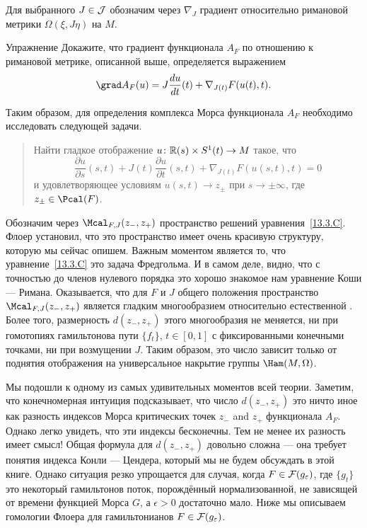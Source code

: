 Для выбранного $J\in\mathcal{J}$ обозначим через $\nabla_{J}$ градиент
относительно римановой метрики $\Omega(\xi,J\eta)$ на $M$.
\begin{ex}{Упражнение}\label{13.3.B}
  Докажите, что градиент функционала $A_{F}$ по отношению к римановой метрике,
  описанной выше, определяется выражением 
  \[
  \grad A_{F}(u)=J\frac{\d u}{\d t}(t)+\nabla_{J(t)}F(u(t),t).
  \]
\end{ex}
Таким образом, для определения комплекса Морса функционала $A_{F}$
необходимо исследовать  следующей задачи.
\begin{quote}
  Найти гладкое отображение $u \colon \mathbb{R}(s)\times S^{1}(t)\to M$ такое,
  что
  \begin{equation}\label{13.3.C}
    \frac{\partial u}{\partial s}(s,t) +
    J(t)\frac{\partial u}{\partial t}(s,t) +
    \nabla_{J(t)}F(u(s,t),t) = 0
  \end{equation}
  и удовлетворяющее условиям $u(s,t)\to z_{\pm}$ при $s\to\pm\infty$,
  где $z_{\pm}\z\in\Pcal(F)$.
\end{quote}
Обозначим через $\Mcal_{F,J}(z_{-},z_{+})$ пространство решений
уравнения~\ref{13.3.C}. 
Флоер установил, что это пространство имеет очень красивую структуру,
которую мы сейчас опишем.
Важным моментом является то, что уравнение~\ref{13.3.C} это задача Фредгольма.
И в самом деле, видно, что с точностью до членов нулевого порядка это
хорошо знакомое нам уравнение Коши --- Римана. 
Оказывается, что для $F$ и $J$ общего положения пространство
$\Mcal_{F,J}(z_{-},z_{+})$ является гладким многообразием относительно
естественной . 
Более того, размерность $d(z_{-}, z_{+})$ этого многообразия не
меняется, ни при гомотопиях гамильтонова пути $\{f_{t}\}$, $t\in [0,1]$
с фиксированными конечными точками, ни при возмущении $J$.
Таким образом, это число зависит только от поднятия отображения
 на универсальное накрытие группы $\Ham(M,
\Omega)$. 

Мы подошли к одному из самых удивительных моментов всей теории.
Заметим, что конечномерная интуиция подсказывает, что число $d(z_{-},
z_{+})$ это ничто иное как разность индексов Морса критических точек
$z_{-}$ and $z_{+}$ функционала $A_{F}$.
Однако легко увидеть, что эти индексы бесконечны.
Тем не менее их разность имеет смысл!
Общая формула для
$d(z_{-},z_{+})$ довольно сложна --- она требует понятия индекса Конли --- Цендера, который мы не будем обсуждать в этой книге.
Однако ситуация резко упрощается для случая, когда
$F\in\mathcal{F}(g_{\varepsilon})$, где $\{g_{t}\}$ это некоторый гамильтонов
поток, порождённый нормализованной, не зависящей от времени функцией
Морса $G$, а $\epsilon>0$ достаточно мало.
Ниже мы описываем гомологии Флоера для гамильтонианов
$F\in\mathcal{F}(g_{\varepsilon})$.

